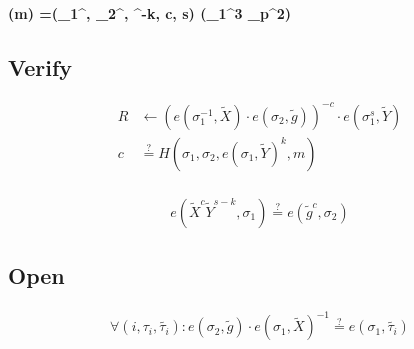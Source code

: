 \documentclass[11pt]{article}
\begin{document}
    \paragraph{
        \color{blue}
        \mu(m) =(\sigma_1^{\prime}, \sigma_2^{\prime}, ^{-k}, c, s) \in (_1^3 \times {}_p^2)
    }

    \subsection{Verify}
    \begin{align}
        R &\leftarrow (e(\sigma_1^{-1}, \tilde{X})\cdot e(\sigma_2, \tilde{g}))^{-c}\cdot e(\sigma_1^s, \tilde{Y})\\
        c & \stackrel{?}{=} H(\sigma_1, \sigma_2, e(\sigma_1, \tilde{Y})^{k}, m)
    \end{align}
    \paragraph{\color{blue}
        \begin{align}
            e(\tilde{X}^c\tilde{Y}^{s-k}, \sigma_1)\stackrel{?}{=}  e(\tilde{g}^c, \sigma_2)
        \end{align}
    }

    \subsection{Open}
    \begin{align}
        \forall (i, \tau_i, \tilde{\tau_i}) :
        e(\sigma_2,\tilde{g})\cdot e(\sigma_1, \tilde{X})^{-1}\stackrel{?}{=} e(\sigma_1, \tilde{\tau_i})
    \end{align}
\end{document}

